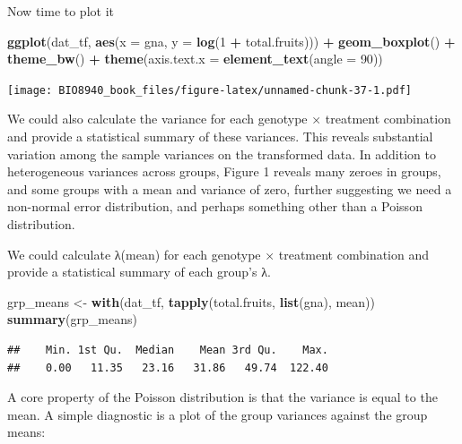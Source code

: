 \documentclass[
  12pt,
]{book}
\newenvironment{Shaded}{\begin{snugshade}}{\end{snugshade}}
\newcommand{\DataTypeTok}[1]{\textcolor[rgb]{0.13,0.29,0.53}{#1}}
\newcommand{\DecValTok}[1]{\textcolor[rgb]{0.00,0.00,0.81}{#1}}
\newcommand{\KeywordTok}[1]{\textcolor[rgb]{0.13,0.29,0.53}{\textbf{#1}}}
\newcommand{\NormalTok}[1]{#1}
\newcommand{\OperatorTok}[1]{\textcolor[rgb]{0.81,0.36,0.00}{\textbf{#1}}}
\newcommand{\StringTok}[1]{\textcolor[rgb]{0.31,0.60,0.02}{#1}}
\begin{document}
Now time to plot it

\begin{Shaded}
\begin{Highlighting}[]
\KeywordTok{ggplot}\NormalTok{(dat_tf, }\KeywordTok{aes}\NormalTok{(}\DataTypeTok{x =}\NormalTok{ gna, }\DataTypeTok{y =} \KeywordTok{log}\NormalTok{(}\DecValTok{1} \OperatorTok{+}\StringTok{ }\NormalTok{total.fruits))) }\OperatorTok{+}
\StringTok{  }\KeywordTok{geom_boxplot}\NormalTok{() }\OperatorTok{+}
\StringTok{  }\KeywordTok{theme_bw}\NormalTok{() }\OperatorTok{+}
\StringTok{  }\KeywordTok{theme}\NormalTok{(}\DataTypeTok{axis.text.x =} \KeywordTok{element_text}\NormalTok{(}\DataTypeTok{angle =} \DecValTok{90}\NormalTok{))}
\end{Highlighting}
\end{Shaded}

\texttt{[image: BIO8940\_book\_files/figure-latex/unnamed-chunk-37-1.pdf]}

We could also calculate the variance for each genotype × treatment combination and provide a statistical summary of these variances.
This reveals substantial variation among the sample variances on the transformed data. In addition to heterogeneous variances across groups, Figure 1 reveals many zeroes in groups, and some groups with a mean and variance of zero, further suggesting we need a non-normal error distribution, and perhaps something other than a Poisson distribution.

We could calculate λ(mean) for each genotype × treatment combination and provide a statistical summary of each group's λ.

\begin{Shaded}
\begin{Highlighting}[]
\NormalTok{grp_means <-}\StringTok{ }\KeywordTok{with}\NormalTok{(dat_tf, }\KeywordTok{tapply}\NormalTok{(total.fruits, }\KeywordTok{list}\NormalTok{(gna), mean))}
\KeywordTok{summary}\NormalTok{(grp_means)}
\end{Highlighting}
\end{Shaded}

\begin{verbatim}
##    Min. 1st Qu.  Median    Mean 3rd Qu.    Max. 
##    0.00   11.35   23.16   31.86   49.74  122.40
\end{verbatim}

A core property of the Poisson distribution is that the variance is equal to the mean. A simple diagnostic is a plot of the group variances against the group means:
\end{document}
